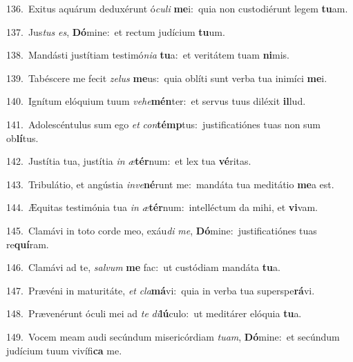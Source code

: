 {\numbfont\textcolor{\numbcolor}{136.}}~Exitus aquárum deduxérunt ó\-\textit{cu}\-\textit{li} \textbf{me}\-i:~\star quia non custodiérunt legem \textbf{tu}\-am.\par
{\numbfont\textcolor{\numbcolor}{137.}}~Jus\textit{tus} \textit{es}\-, \textbf{Dó}\-mine:~\star et rectum judícium \textbf{tu}\-um.\par
{\numbfont\textcolor{\numbcolor}{138.}}~Mandásti justítiam testimó\-\textit{ni}\-\textit{a} \textbf{tu}\-a:~\star et veritátem tuam \textbf{ni}\-mis.\par
{\numbfont\textcolor{\numbcolor}{139.}}~Tabéscere me fecit \textit{ze}\-\textit{lus} \textbf{me}\-us:~\star quia oblíti sunt verba tua inimíci \textbf{me}\-i.\par
{\numbfont\textcolor{\numbcolor}{140.}}~Ignítum elóquium tuum \textit{ve}\-\textit{he}\textbf{mén}ter:~\star et servus tuus diléxit \textbf{il}\-lud.\par
{\numbfont\textcolor{\numbcolor}{141.}}~Adolescéntulus sum ego \textit{et} \textit{con}\-\textbf{témp}tus:~\star justificatiónes tuas non sum ob\-\textbf{lí}\-tus.\par
{\numbfont\textcolor{\numbcolor}{142.}}~Justítia tua, justítia \textit{in} \textit{æ}\-\textbf{tér}num:~\star et lex tua \textbf{vé}\-ritas.\par
{\numbfont\textcolor{\numbcolor}{143.}}~Tribulátio, et angústia \textit{in}\-\textit{ve}\textbf{né}runt me:~\star mandáta tua meditátio \textbf{me}\-a est.\par
{\numbfont\textcolor{\numbcolor}{144.}}~Æquitas testimónia tua \textit{in} \textit{æ}\-\textbf{tér}num:~\star intelléctum da mihi, et \textbf{vi}\-vam.\par
{\numbfont\textcolor{\numbcolor}{145.}}~Clamávi in toto corde meo, exáu\textit{di} \textit{me}\-, \textbf{Dó}\-mine:~\star justificatiónes tuas re\-\textbf{quí}\-ram.\par
{\numbfont\textcolor{\numbcolor}{146.}}~Clamávi ad te, \textit{sal}\-\textit{vum} \textbf{me} fac:~\star ut custódiam mandáta \textbf{tu}\-a.\par
{\numbfont\textcolor{\numbcolor}{147.}}~Prævéni in maturitáte, \textit{et} \textit{cla}\-\textbf{má}vi:~\star quia in verba tua superspe\-\textbf{rá}\-vi.\par
{\numbfont\textcolor{\numbcolor}{148.}}~Prævenérunt óculi mei ad \textit{te} \textit{di}\-\textbf{lú}culo:~\star ut meditárer elóquia \textbf{tu}\-a.\par
{\numbfont\textcolor{\numbcolor}{149.}}~Vocem meam audi secúndum misericórdiam \textit{tu}\-\textit{am}, \textbf{Dó}\-mine:~\star et secúndum judícium tuum vivífi\textbf{ca} me.\par
